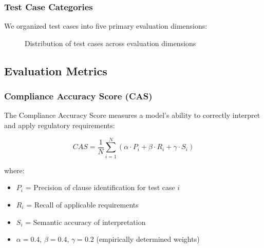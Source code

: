 \documentclass[11pt,a4paper]{article}
\begin{document}
\subsubsection{Test Case Categories}

We organized test cases into five primary evaluation dimensions:

\begin{figure}[H]
\centering
{}
\caption{Distribution of test cases across evaluation dimensions}
\label{fig:testdist}
\end{figure}

\subsection{Evaluation Metrics}

\subsubsection{Compliance Accuracy Score (CAS)}

The Compliance Accuracy Score measures a model's ability to correctly interpret and apply regulatory requirements:

\begin{equation}
CAS = \frac{1}{N} \sum_{i=1}^{N} \left( \alpha \cdot P_i + \beta \cdot R_i + \gamma \cdot S_i \right)
\end{equation}

where:
\begin{itemize}
    \item $P_i$ = Precision of clause identification for test case $i$
    \item $R_i$ = Recall of applicable requirements
    \item $S_i$ = Semantic accuracy of interpretation
    \item $\alpha = 0.4$, $\beta = 0.4$, $\gamma = 0.2$ (empirically determined weights)
\end{itemize}
\end{document}
